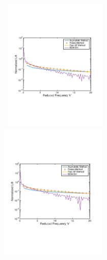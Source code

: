 \documentclass{article}
\begin{document}
\begin{figure}[h]
\centering
\begin{minipage}{0.5\textwidth}
	\centering
	\includegraphics[width = 3.5in, height = 2.5in]{NACA1106}
\end{minipage}%
\begin{minipage}{0.5\textwidth}
	\centering
	\includegraphics[width = 3.4in, height = 2.6in]{NACA2106}
\end{minipage}%
\end{figure}
\end{document}
